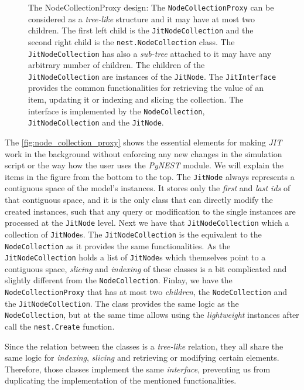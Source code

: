 \begin{figure}[ht!]
    \caption{The NodeCollectionProxy design: The \texttt{NodeCollectionProxy} can be considered as a \emph{tree-like} structure and it may have at most two children. The first left child is the \texttt{JitNodeCollection} and the second right child is the \texttt{nest.NodeCollection} class. The \texttt{JitNodeCollection} has also a \emph{sub-tree} attached to it may have any arbitrary number of children. The children of the \texttt{JitNodeCollection} are instances of the \texttt{JitNode}. The \texttt{JitInterface} provides the common functionalities for retrieving the value of an item, updating it or indexing and slicing the collection. The interface is implemented by the \texttt{NodeCollection}, \texttt{JitNodeCollection} and the \texttt{JitNode}.}
    \label{fig:node_collection_proxy}
\end{figure}

The \autoref{fig:node_collection_proxy} shows the essential elements for making \emph{JIT} work in the background without enforcing any new changes in the simulation script or the way how the user uses the \emph{PyNEST} module. We will explain the items in the figure from the bottom to the top. The \texttt{JitNode} always represents a contiguous space of the model's instances. It stores only the \emph{first} and \emph{last ids} of that contiguous space, and it is the only class that can directly modify the created instances, such that any query or modification to the single instances are processed at the \texttt{JitNode} level. Next we have that \texttt{JitNodeCollection} which a collection of \texttt{JitNode}s. The \texttt{JitNodeCollection} is the equivalent to the \texttt{NodeCollection} as it provides the same functionalities. As the \texttt{JitNodeCollection} holds a list of \texttt{JitNode}s which themselves point to a contiguous space, \emph{slicing} and \emph{indexing} of these classes is a bit complicated and slightly different from the \texttt{NodeCollection}. Finlay, we have the \texttt{NodeCollectionProxy} that has at most two \emph{children}, the \texttt{NodeCollection} and the \texttt{JitNodeCollection}. The class provides the same logic as the \texttt{NodeCollection}, but at the same time allows using the \emph{lightweight} instances after call the \texttt{nest.Create} function.

Since the relation between the classes is a  \emph{tree-like} relation, they all share the same logic for \emph{indexing}, \emph{slicing} and retrieving or modifying certain elements. Therefore, those classes implement the same \emph{interface}, preventing us from duplicating the implementation of the mentioned functionalities. 




